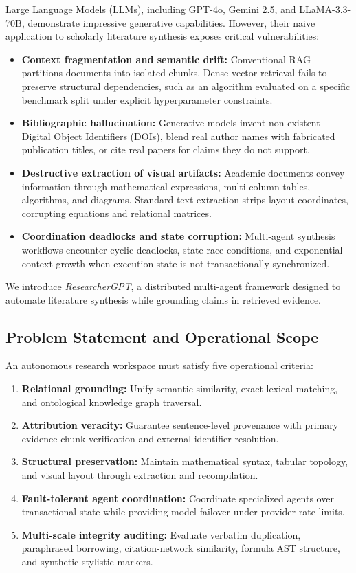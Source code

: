 \documentclass[conference]{IEEEtran}
\begin{document}
Large Language Models (LLMs), including GPT-4o, Gemini 2.5, and LLaMA-3.3-70B, demonstrate impressive generative capabilities. However, their naive application to scholarly literature synthesis exposes critical vulnerabilities:
\begin{itemize}
\item \textbf{Context fragmentation and semantic drift:} Conventional RAG partitions documents into isolated chunks. Dense vector retrieval fails to preserve structural dependencies, such as an algorithm evaluated on a specific benchmark split under explicit hyperparameter constraints.
\item \textbf{Bibliographic hallucination:} Generative models invent non-existent Digital Object Identifiers (DOIs), blend real author names with fabricated publication titles, or cite real papers for claims they do not support.
\item \textbf{Destructive extraction of visual artifacts:} Academic documents convey information through mathematical expressions, multi-column tables, algorithms, and diagrams. Standard text extraction strips layout coordinates, corrupting equations and relational matrices.
\item \textbf{Coordination deadlocks and state corruption:} Multi-agent synthesis workflows encounter cyclic deadlocks, state race conditions, and exponential context growth when execution state is not transactionally synchronized.
\end{itemize}

We introduce \textit{ResearcherGPT}, a distributed multi-agent framework designed to automate literature synthesis while grounding claims in retrieved evidence.





\subsection{Problem Statement and Operational Scope}
An autonomous research workspace must satisfy five operational criteria:
\begin{enumerate}
\item \textbf{Relational grounding:} Unify semantic similarity, exact lexical matching, and ontological knowledge graph traversal.
\item \textbf{Attribution veracity:} Guarantee sentence-level provenance with primary evidence chunk verification and external identifier resolution.
\item \textbf{Structural preservation:} Maintain mathematical syntax, tabular topology, and visual layout through extraction and recompilation.
\item \textbf{Fault-tolerant agent coordination:} Coordinate specialized agents over transactional state while providing model failover under provider rate limits.
\item \textbf{Multi-scale integrity auditing:} Evaluate verbatim duplication, paraphrased borrowing, citation-network similarity, formula AST structure, and synthetic stylistic markers.
\end{enumerate}
\end{document}
